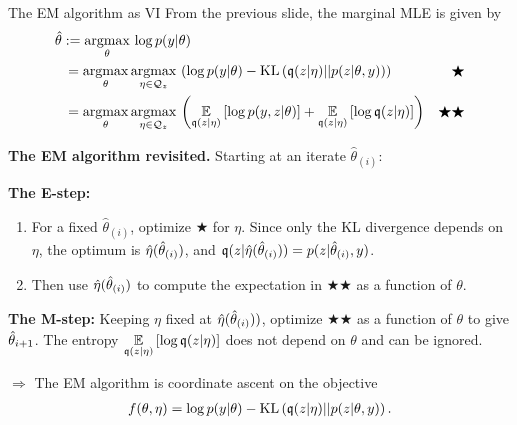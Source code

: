 \begin{frame}{The EM algorithm as VI}
%
From the previous slide, the marginal MLE is given by
%
\begin{align*}
%
\MoveEqLeft
\thetahat := \argmax{\theta} \log p(\y | \theta) \\
={}&
\argmax{\theta} \argmax{\eta \in \qdom_z} \left(
\log p(\y | \theta) -
    \kl{\q(\z | \eta)}{p(\z | \theta, \y)}  \right) & \bigstar
\\={}&
\argmax{\theta} \argmax{\eta \in \qdom_z} \left(
\expect{\q(\z | \eta)}{
    \log p(\y, \z | \theta) }
+ \expect{\q(\z | \eta)}{\log \q(\z | \eta)
}\right) & \bigstar\bigstar
%
\end{align*}
%
\hrulefill

\textbf{The EM algorithm revisited.}  Starting at an iterate $\hat\theta_{(i)}$:

\textbf{The E-step:}
\begin{enumerate}
%
    \item For a fixed $\hat\theta_{(i)}$, optimize
$\bigstar$ for $\eta$.  Since only the KL divergence depends on
$\eta$, the optimum is $\hat{\eta}(\hat\theta_{(i)})$,
and $\mathfrak{q}(z | \hat{\eta}(\hat\theta_{(i)})) = p(z | \hat\theta_{(i)}, y)$.
%
    \item Then use $\hat{\eta}(\hat\theta_{(i)})$ to compute the expectation in
$\bigstar\bigstar$ as a function of $\theta$.
%
\end{enumerate}

\textbf{The M-step:}  Keeping $\eta$ fixed at $\hat{\eta}(\hat\theta_{(i)}))$,
optimize $\bigstar\bigstar$ as a function of $\theta$ to give
$\hat\theta_{i + 1}$.  The entropy
$\underset{\mathfrak{q}(z | \eta)}{\mathbb{E}}\left[\log \mathfrak{q}(z | \eta)\right]$ does not depend on $\theta$
and can be ignored.

\hrulefill

$\Rightarrow$ The EM algorithm is coordinate ascent on the objective
%
\begin{align*}
%
f(\theta, \eta) =
\log p(\y | \theta) - \kl{\q(\z | \eta)}{p(\z | \theta, \y)}.
%
\end{align*}

\end{frame}


